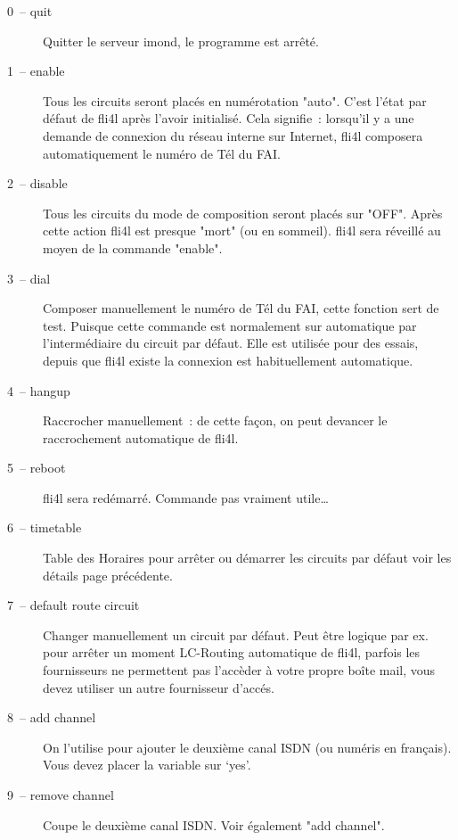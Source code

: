   \begin{description}
  \item[0~-- quit] Quitter le serveur imond, le programme est arrêté.


  \item[1~-- enable] Tous les circuits seront placés en numérotation
    "auto". C'est l'état par défaut de fli4l après l'avoir initialisé.
    Cela signifie~: lorsqu'il y a une demande de connexion du réseau
    interne sur Internet, fli4l composera automatiquement le numéro
    de Tél du FAI.


  \item[2~-- disable] Tous les circuits du mode de composition seront
    placés sur "OFF". Après cette action fli4l est presque "mort"
    (ou en sommeil). fli4l sera réveillé au moyen de la commande "enable".


  \item[3~-- dial] Composer manuellement le numéro de Tél du FAI, cette
    fonction sert de test. Puisque cette commande est normalement sur
    automatique par l'intermédiaire du circuit par défaut. Elle est
    utilisée pour des essais, depuis que fli4l existe la connexion est
    habituellement automatique.


  \item[4~-- hangup] Raccrocher manuellement~: de cette façon, on peut
    devancer le raccrochement automatique de fli4l.


  \item[5~-- reboot] fli4l sera redémarré. Commande pas vraiment utile\ldots


  \item[6~-- timetable] Table des Horaires pour arrêter ou démarrer
    les circuits par défaut voir les détails page précédente.


  \item[7~-- default route circuit] Changer manuellement un circuit
    par défaut. Peut être logique par ex. pour arrêter un moment
    LC-Routing automatique de fli4l, parfois les fournisseurs ne
    permettent pas l'accèder à votre propre boîte mail, vous devez
    utiliser un autre fournisseur d'accés.


  \item[8~-- add channel] On l'utilise pour ajouter le deuxième canal
    ISDN (ou numéris en français). Vous devez placer la variable
     sur `yes'.


  \item[9~-- remove channel] Coupe le deuxième canal ISDN. Voir
    également "add channel".

  \end{description}

